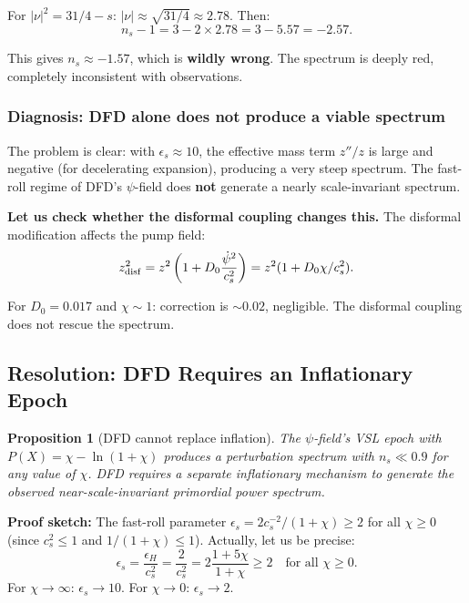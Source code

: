 \documentclass[11pt,a4paper]{article}
\newtheorem{proposition}{Proposition}
\begin{document}
For $|\nu|^2 = 31/4 - s$: $|\nu| \approx \sqrt{31/4} \approx 2.78$. Then:
\begin{equation}
n_s - 1 = 3 - 2 \times 2.78 = 3 - 5.57 = -2.57.
\end{equation}

This gives $n_s \approx -1.57$, which is \textbf{wildly wrong}. The spectrum is deeply red, completely inconsistent with observations.

\subsubsection{Diagnosis: DFD alone does not produce a viable spectrum}

The problem is clear: with $\epsilon_s \approx 10$, the effective mass term $z''/z$ is large and negative (for decelerating expansion), producing a very steep spectrum. The fast-roll regime of DFD's $\psi$-field does \textbf{not} generate a nearly scale-invariant spectrum.

\textbf{Let us check whether the disformal coupling changes this.} The disformal modification affects the pump field:
\begin{equation}
z_{\rm disf}^2 = z^2\left(1 + D_0 \frac{\dot\psi^2}{c_s^2}\right) = z^2(1 + D_0 \chi / c_s^2).
\end{equation}

For $D_0 = 0.017$ and $\chi \sim 1$: correction is $\sim 0.02$, negligible. The disformal coupling does not rescue the spectrum.

\subsection{Resolution: DFD Requires an Inflationary Epoch}

\begin{proposition}[DFD cannot replace inflation]
The $\psi$-field's VSL epoch with $P(X) = \chi - \ln(1+\chi)$ produces a perturbation spectrum with $n_s \ll 0.9$ for any value of $\chi$. DFD requires a separate inflationary mechanism to generate the observed near-scale-invariant primordial power spectrum.
\end{proposition}

\textbf{Proof sketch:} The fast-roll parameter $\epsilon_s = 2c_s^{-2}/(1+\chi) \geq 2$ for all $\chi \geq 0$ (since $c_s^2 \leq 1$ and $1/(1+\chi) \leq 1$). Actually, let us be precise:
\begin{equation}
\epsilon_s = \frac{\epsilon_H}{c_s^2} = \frac{2}{c_s^2} = 2\frac{1+5\chi}{1+\chi} \geq 2 \quad \text{for all } \chi \geq 0.
\end{equation}
For $\chi \to \infty$: $\epsilon_s \to 10$. For $\chi \to 0$: $\epsilon_s \to 2$.
\end{document}
